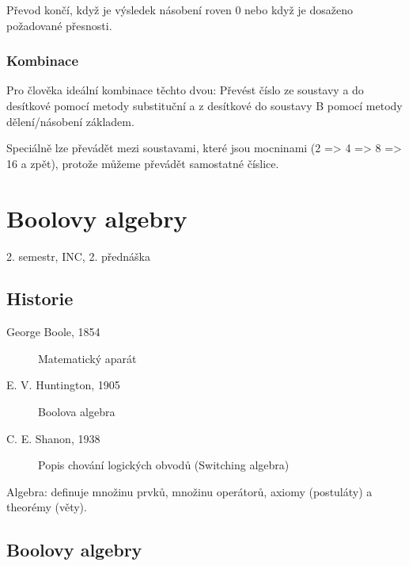 \documentclass[a4paper, 11pt]{report}
\begin{document}
Převod končí, když je výsledek násobení roven 0 nebo když je dosaženo požadované přesnosti.

\subsection{Kombinace}

Pro člověka ideální kombinace těchto dvou: Převést číslo ze soustavy a do desítkové pomocí metody substituční a z desítkové do soustavy B pomocí metody dělení/násobení základem.

Speciálně lze převádět mezi soustavami, které jsou mocninami (2 => 4 => 8 => 16 a zpět), protože můžeme převádět samostatné číslice.























\setcounter{chapter}{18}
\chapter{Boolovy algebry} \label{cha:19}

2. semestr, INC, 2. přednáška

\section{Historie}
\begin{description}
	\item[George Boole, 1854] Matematický aparát
	\item[E. V. Huntington, 1905] Boolova algebra
	\item[C. E. Shanon, 1938] Popis chování logických obvodů (Switching algebra)
\end{description}

Algebra: definuje množinu prvků, množinu operátorů, axiomy (postuláty) a theorémy (věty).

\section{Boolovy algebry}
\end{document}
